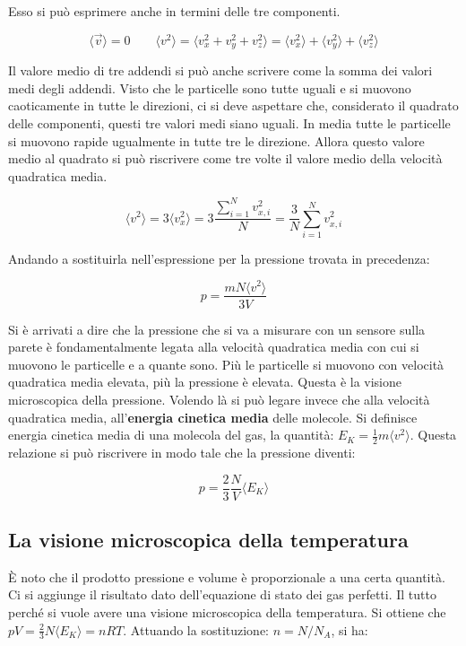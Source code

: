 Esso si può esprimere anche in termini delle tre componenti.

\[
	\langle \vec{v} \rangle = 0 \qquad \langle v^2 \rangle = \langle v_x^2 +v_y^2 +v_z^2 \rangle = \langle v_x^2 \rangle + \langle v_y^2 \rangle + \langle v_z^2 \rangle
\]

Il valore medio di tre addendi si può anche scrivere come la somma dei valori medi degli addendi. Visto che le particelle sono tutte uguali e si muovono caoticamente in tutte le direzioni, ci si deve aspettare che, considerato il quadrato delle componenti, questi tre valori medi siano uguali. In media tutte le particelle si muovono rapide ugualmente in tutte tre le direzione. Allora questo valore medio al quadrato si può riscrivere come tre volte il valore medio della velocità quadratica media.

\[
	\langle v^2 \rangle = 3 \langle v_x^2 \rangle = 3 \frac{\sum_{i=1}^N v_{x,i}^2}{N} = \frac{3}{N} \sum_{i=1}^N v_{x,i}^2
\]

Andando a sostituirla nell'espressione per la pressione trovata in precedenza:

\[
	\boxed{p = \frac{mN\langle v^2 \rangle}{3V}}
\]

Si è arrivati a dire che la pressione che si va a misurare con un sensore sulla parete è fondamentalmente legata alla velocità quadratica media con cui si muovono le particelle e a quante sono. Più le particelle si muovono con velocità quadratica media elevata, più la pressione è elevata. Questa è la visione microscopica della pressione. Volendo là si può legare invece che alla velocità quadratica media, all'\textbf{energia cinetica media} delle molecole. Si definisce energia cinetica media di una molecola del gas, la quantità: $E_K = \frac{1}{2} m\langle v^2 \rangle$. Questa relazione si può riscrivere in modo tale che la pressione diventi:

\[
	\boxed{p = \frac{2}{3} \frac{N}{V} \langle E_K \rangle}
\]

\subsection{La visione microscopica della temperatura}

È noto che il prodotto pressione e volume è proporzionale a una certa quantità. Ci si aggiunge il risultato dato dell'equazione di stato dei gas perfetti. Il tutto perché si vuole avere una visione microscopica della temperatura.
Si ottiene che $pV = \frac{2}{3} N \langle E_K \rangle = nRT$. Attuando la sostituzione: $n=N/N_A$, si ha:

